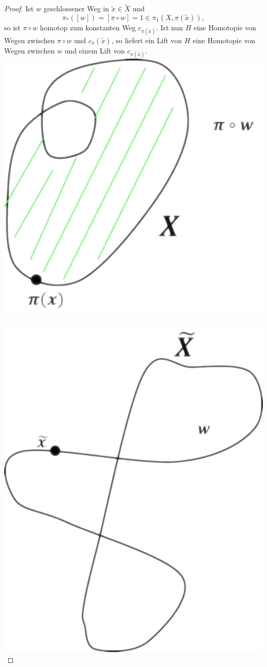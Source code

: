 \documentclass[a4paper,11pt,notitlepage]{report}
\theoremstyle{definition}
\begin{document}
\begin{proof}
	Ist $w$ geschlossener Weg in $\widetilde{x} \in \widetilde{X}$ und
$$\pi_*([w]) = [\pi \circ w] = 1 \in \pi_1(X, \pi(\widetilde{x})),$$
so ist $\pi \circ w$ homotop zum konstanten Weg $c_{\pi(\widetilde{x})}$. Ist nun $H$ eine Homotopie von Wegen zwischen $\pi \circ w$ und $c_\pi(\widetilde{x})$, so liefert ein Lift von $H$ eine Homotopie von Wegen zwischen $w$ und einem Lift von $c_{\pi(\widetilde{x})}$. 
\newline
\includegraphics[scale=0.4]{images/Homotopie_konstanter_Weg.png} $\qquad$
\includegraphics[scale=0.4]{images/Homotopie_konstanter_Weg_Lift.png}

\end{proof}
\end{document}
